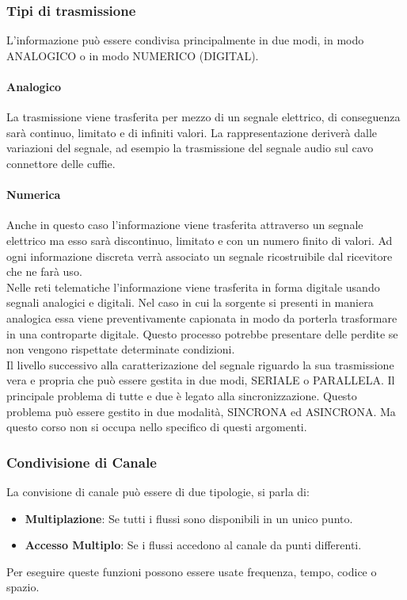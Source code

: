 \documentclass[12pt]{article}
\begin{document}
\subsubsection{Tipi di trasmissione}
L'informazione può essere condivisa principalmente in due modi, in modo ANALOGICO o in modo NUMERICO (DIGITAL).
\paragraph{Analogico}
La trasmissione viene trasferita per mezzo di un segnale elettrico, di conseguenza sarà continuo, limitato e di infiniti valori. La rappresentazione deriverà dalle variazioni del segnale, ad esempio la trasmissione del segnale audio sul cavo connettore delle cuffie.
\paragraph{Numerica}
Anche in questo caso l'informazione viene trasferita attraverso un segnale elettrico ma esso sarà discontinuo, limitato e con un numero finito di valori. Ad ogni informazione discreta verrà associato un segnale ricostruibile dal ricevitore che ne farà uso.\\
Nelle reti telematiche l'informazione viene trasferita in forma digitale usando segnali analogici e digitali. Nel caso in cui la sorgente si presenti in maniera analogica essa viene preventivamente capionata in modo da porterla trasformare in una controparte digitale. Questo processo potrebbe presentare delle perdite se non vengono rispettate determinate condizioni.\\
Il livello successivo alla caratterizazione del segnale riguardo la sua trasmissione vera e propria che può essere gestita in due modi, SERIALE o PARALLELA. Il principale problema di tutte e due è legato alla sincronizzazione. Questo problema può essere gestito in due modalità, SINCRONA ed ASINCRONA. Ma questo corso non si occupa nello specifico di questi argomenti.

\subsubsection{Condivisione di Canale}
La convisione di canale può essere di due tipologie, si parla di:
\begin{itemize}
  \item \textbf{Multiplazione}: Se tutti i flussi sono disponibili in un unico punto.
  \item \textbf{Accesso Multiplo}: Se i flussi accedono al canale da punti differenti.
\end{itemize}
Per eseguire queste funzioni possono essere usate frequenza, tempo, codice o spazio.
\end{document}
